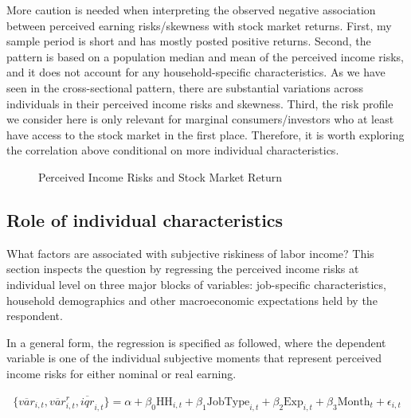 \documentclass[12pt,notitlepage,onecolumn,aps,pra]{article}
\begin{document}
More caution is needed when interpreting the observed negative
association between perceived earning risks/skewness with stock market
returns. First, my sample period is short and has mostly posted positive
returns. Second, the pattern is based on a population median and mean of
the perceived income risks, and it does not account for any
household-specific characteristics. As we have seen in the
cross-sectional pattern, there are substantial variations across
individuals in their perceived income risks and skewness. Third, the
risk profile we consider here is only relevant for marginal
consumers/investors who at least have access to the stock market in the
first place. Therefore, it is worth exploring the correlation above
conditional on more individual characteristics.


    \begin{figure*}[!ht]
        \begin{center}\end{center}
        \caption{Perceived Income Risks and Stock Market Return}
        \label{fig:tssp500}
    \end{figure*}
    

    \hypertarget{role-of-individual-characteristics}{%
\subsection{Role of individual
characteristics}\label{role-of-individual-characteristics}}

What factors are associated with subjective riskiness of labor income?
This section inspects the question by regressing the perceived income
risks at individual level on three major blocks of variables:
job-specific characteristics, household demographics and other
macroeconomic expectations held by the respondent.

In a general form, the regression is specified as followed, where the
dependent variable is one of the individual subjective moments that
represent perceived income risks for either nominal or real earning.

\begin{eqnarray}
\{\overline{var}_{i,t}, \overline{var}^r_{i,t}, \overline{iqr}_{i,t}\} = \alpha + \beta_0 \textrm{HH}_{i,t} + \beta_1 \textrm{JobType}_{i,t} + \beta_2 \textrm{Exp}_{i,t} + \beta_3 \textrm{Month}_t + \epsilon_{i,t}
\end{eqnarray}
\end{document}
